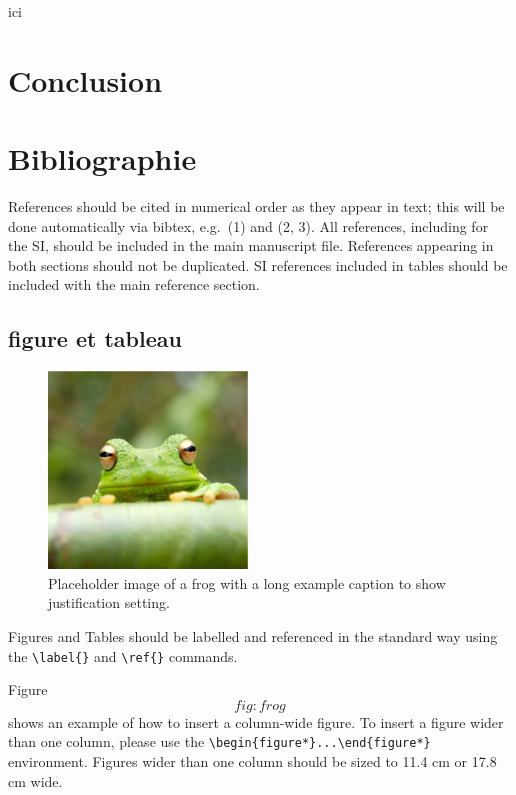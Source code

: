 \documentclass[9pt,twocolumn,twoside,]{pnas-new}
\begin{document}
ici

\hypertarget{conclusion}{%
\section*{Conclusion}\label{conclusion}}

\hypertarget{references}{%
\section*{Bibliographie}\label{references}}

References should be cited in numerical order as they appear in text;
this will be done automatically via bibtex, e.g.~(1) and (2, 3). All
references, including for the SI, should be included in the main
manuscript file. References appearing in both sections should not be
duplicated. SI references included in tables should be included with the
main reference section.

\hypertarget{figure-et-tableau}{%
\subsection*{figure et tableau}\label{figure-et-tableau}}

\begin{figure}
\centering
\includegraphics{frog.png}
\caption{Placeholder image of a frog with a long example caption to show
justification setting.{}}
\end{figure}

Figures and Tables should be labelled and referenced in the standard way
using the \texttt{\textbackslash{}label\{\}} and
\texttt{\textbackslash{}ref\{\}} commands.

Figure \[fig:frog\] shows an example of how to insert a column-wide
figure. To insert a figure wider than one column, please use the
\texttt{\textbackslash{}begin\{figure*\}...\textbackslash{}end\{figure*\}}
environment. Figures wider than one column should be sized to 11.4 cm or
17.8 cm wide.
\end{document}
